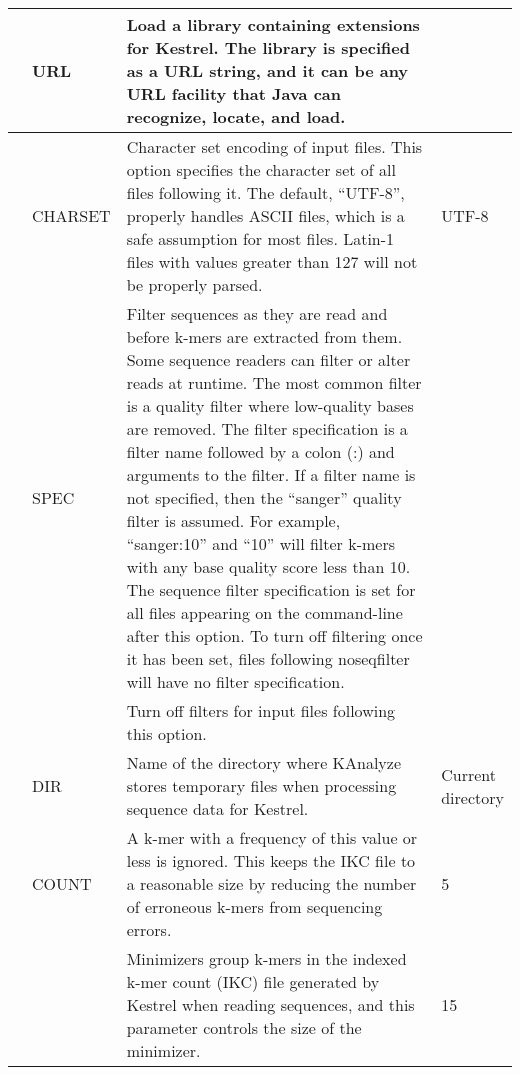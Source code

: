 \begin{small}
\begin{longtable}{|p{\optwidth}|p{\argwidth}|p{\dscwidth}|p{}|}
		\lopt{liburl} & URL &
		Load a library containing extensions for Kestrel. The library is specified as a URL string, and it can be any URL facility that Java can recognize, locate, and load.
		&
		\\ \hline
		
		\lopt{charset} & CHARSET &
		Character set encoding of input files. This option specifies the character set of all files following it. The default, ``UTF-8'', properly handles ASCII files, which is a safe assumption for most files. Latin-1 files with values greater than 127 will not be properly parsed.
		& UTF-8
		\\ \hline
		
		\optbox{\lopt{seqfilter}\\\lopt{quality}} & SPEC &
		Filter sequences as they are read and before k-mers are extracted from them. Some sequence readers can filter or alter reads at runtime. The most common filter is a quality filter where low-quality bases are removed. The filter specification is a filter name followed by a colon (:) and arguments to the filter. If a filter name is not specified, then the ``sanger'' quality filter is assumed. For example, ``sanger:10'' and ``10'' will filter k-mers with any base quality score less than 10. The sequence filter specification is set for all files appearing on the command-line after this option. To turn off filtering once it has been set, files following \ddash{}noseqfilter will have no filter specification.
		&
		\\ \hline
		
		\lopt{noseqfilter} & &
		Turn off filters for input files following this option.
		&
		\\ \hline
		
		\lopt{temploc} & DIR &
		Name of the directory where KAnalyze stores temporary files when processing sequence data for Kestrel.
		& \parbox{2cm}{Current\\directory}
		\\ \hline
		
		 & COUNT &
		A k-mer with a frequency of this value or less is ignored. This keeps the IKC file to a reasonable size by reducing the number of erroneous k-mers from sequencing errors.
		& 5
		\\ \hline
		
		 & &
		Minimizers group k-mers in the indexed k-mer count (IKC) file generated by Kestrel when reading sequences, and this parameter controls the size of the minimizer.
		& 15
		\\ \hline
		

\end{longtable}
\end{small}
